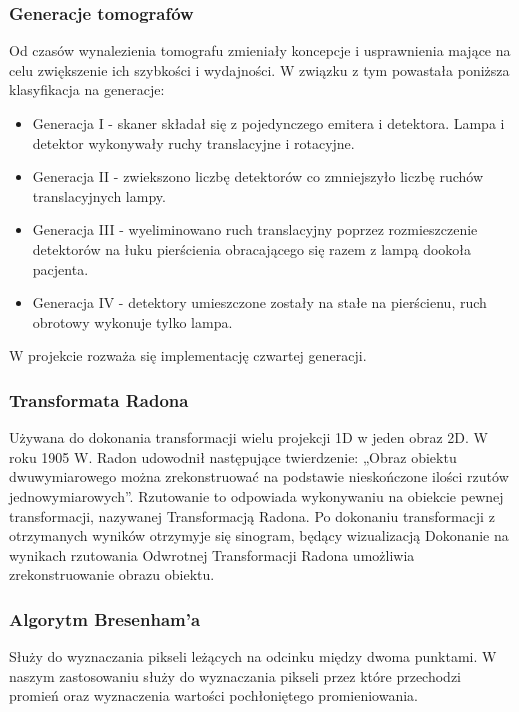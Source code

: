 \documentclass[A_4paper,12pt]{article}
\begin{document}
\subsubsection{Generacje tomografów}
Od czasów wynalezienia tomografu zmieniały koncepcje i usprawnienia mające na celu zwiększenie ich szybkości i wydajności.
W związku z tym powastała poniższa klasyfikacja na generacje:
\begin{itemize}
\item Generacja I - skaner składał się z pojedynczego emitera i detektora. Lampa i detektor wykonywały ruchy translacyjne i rotacyjne.
\item Generacja II - zwiekszono liczbę detektorów co zmniejszyło liczbę ruchów translacyjnych lampy.
\item Generacja III - wyeliminowano ruch translacyjny poprzez rozmieszczenie detektorów na łuku pierścienia obracającego się razem z lampą dookoła pacjenta.
\item Generacja IV - detektory umieszczone zostały na stałe na pierścienu, ruch obrotowy wykonuje tylko lampa.
\end{itemize}

W projekcie rozważa się implementację czwartej generacji.

\subsubsection{Transformata Radona}
Używana do dokonania transformacji wielu projekcji 1D w jeden obraz 2D.
W roku 1905 W. Radon udowodnił następujące twierdzenie: „Obraz obiektu dwuwymiarowego można zrekonstruować na podstawie nieskończone ilości rzutów jednowymiarowych”. Rzutowanie to odpowiada wykonywaniu na obiekcie pewnej transformacji, nazywanej Transformacją Radona. 
Po dokonaniu transformacji z otrzymanych wyników otrzymyje się sinogram, będący wizualizacją
Dokonanie na wynikach rzutowania Odwrotnej Transformacji Radona umożliwia zrekonstruowanie obrazu obiektu.

\subsubsection{Algorytm Bresenham'a}
Służy do wyznaczania pikseli leżących na odcinku między dwoma punktami. W naszym zastosowaniu służy do wyznaczania pikseli przez które przechodzi promień oraz wyznaczenia wartości pochłoniętego promieniowania.
\end{document}

